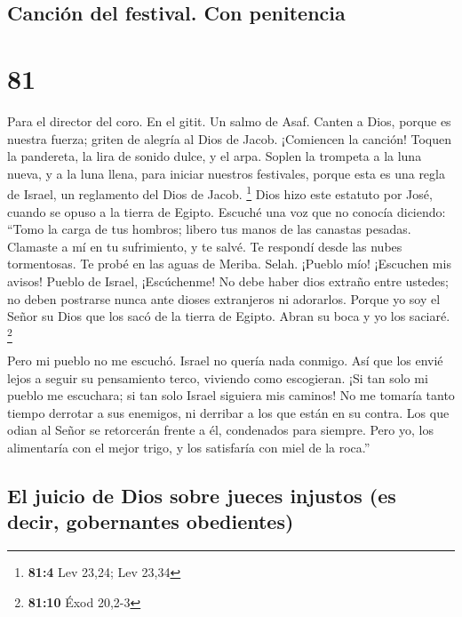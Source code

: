 \hypertarget{canciuxf3n-del-festival.-con-penitencia}{%
\subsection{Canción del festival. Con
penitencia}\label{canciuxf3n-del-festival.-con-penitencia}}

\hypertarget{section-80}{%
\section{81}\label{section-80}}

Para el director del coro. En el gitit. Un salmo de Asaf. 
Canten a Dios, porque es nuestra fuerza; griten de alegría al Dios de
Jacob.  ¡Comiencen la canción! Toquen la pandereta, la lira
de sonido dulce, y el arpa.  Soplen la trompeta a la luna
nueva, y a la luna llena, para iniciar nuestros festivales, 
porque esta es una regla de Israel, un reglamento del Dios de Jacob.
\footnote{\textbf{81:4} Lev 23,24; Lev 23,34}  Dios hizo
este estatuto por José, cuando se opuso a la tierra de Egipto. Escuché
una voz que no conocía diciendo:  ``Tomo la carga de tus
hombros; libero tus manos de las canastas pesadas.  Clamaste
a mí en tu sufrimiento, y te salvé. Te respondí desde las nubes
tormentosas. Te probé en las aguas de Meriba. Selah. 
¡Pueblo mío! ¡Escuchen mis avisos! Pueblo de Israel, ¡Escúchenme!
 No debe haber dios extraño entre ustedes; no deben
postrarse nunca ante dioses extranjeros ni adorarlos. 
Porque yo soy el Señor su Dios que los sacó de la tierra de Egipto.
Abran su boca y yo los saciaré. \footnote{\textbf{81:10} Éxod 20,2-3}

 Pero mi pueblo no me escuchó. Israel no quería nada
conmigo.  Así que los envié lejos a seguir su pensamiento
terco, viviendo como escogieran.  ¡Si tan solo mi pueblo me
escuchara; si tan solo Israel siguiera mis caminos!  No me
tomaría tanto tiempo derrotar a sus enemigos, ni derribar a los que
están en su contra.  Los que odian al Señor se retorcerán
frente a él, condenados para siempre.  Pero yo, los
alimentaría con el mejor trigo, y los satisfaría con miel de la roca.''

\hypertarget{el-juicio-de-dios-sobre-jueces-injustos-es-decir-gobernantes-obedientes}{%
\subsection{El juicio de Dios sobre jueces injustos (es decir,
gobernantes
obedientes)}\label{el-juicio-de-dios-sobre-jueces-injustos-es-decir-gobernantes-obedientes}}

